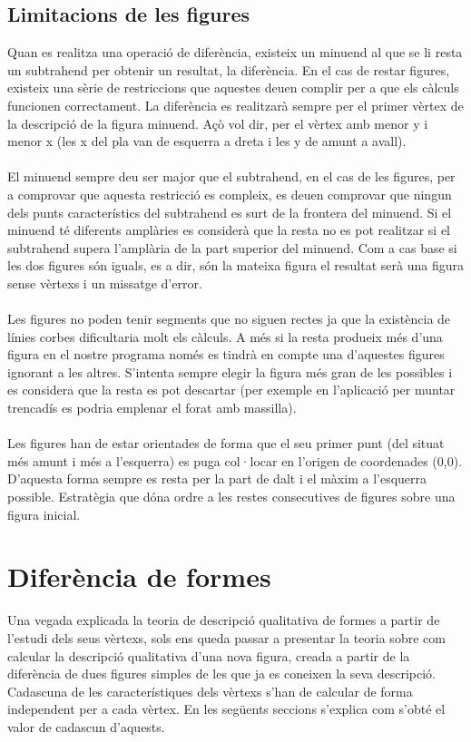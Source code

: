 \documentclass{article}
\begin{document}
\subsection{Limitacions de les figures}
Quan es realitza una operació de diferència, existeix un minuend al que se li resta un subtrahend per obtenir un resultat, la diferència. En el cas de restar figures, existeix una sèrie de restriccions que aquestes deuen complir per a que els càlculs funcionen correctament.
La diferència es realitzarà sempre per el primer vèrtex de la descripció de la figura minuend. Açò vol dir, per el vèrtex amb menor y i menor x (les x del pla van de esquerra a dreta i les y de amunt a avall).
\\
\\
El minuend sempre deu ser major que el subtrahend, en el cas de les figures, per a comprovar que aquesta restricció es compleix, es deuen comprovar que ningun dels punts característics del subtrahend es surt de la frontera del minuend.
Si el minuend té diferents amplàries es considerà que la resta no es pot realitzar si el subtrahend supera l'amplària de la part superior del minuend. 
Com a cas base si les dos figures són iguals, es a dir, són la mateixa figura el resultat serà una figura sense vèrtexs i un missatge d'error.
\\
\\
Les figures no poden tenir segments que no siguen rectes ja que la existència de línies corbes dificultaria molt els càlculs.
A més si la resta produeix més d'una figura en el nostre programa només es tindrà en compte una d'aquestes figures ignorant a les altres.
S'intenta sempre elegir la figura més gran de les possibles i es considera que la resta es pot descartar (per exemple en l'aplicació per muntar trencadís es podria emplenar el forat amb massilla).
\\
\\
Les figures han de estar orientades de forma que el seu primer punt (del situat més amunt i més a l'esquerra) es puga col·locar en l'origen de coordenades (0,0).
D'aquesta forma sempre es resta per la part de dalt i el màxim a l'esquerra possible.
Estratègia que dóna ordre a les restes consecutives de figures sobre una figura inicial.
\\

\section{Diferència de formes}
Una vegada explicada la teoria de descripció qualitativa de formes a partir de l'estudi dels seus vèrtexs, sols ens queda passar a presentar la teoria sobre com calcular la descripció qualitativa d'una nova figura, creada a partir de la  diferència de dues figures simples de les que ja es coneixen la seva descripció.
Cadascuna de les característiques dels vèrtexs s'han de calcular de forma independent per a cada vèrtex.
En les següents seccions s'explica com s'obté el valor de cadascun d'aquests.
\end{document}
